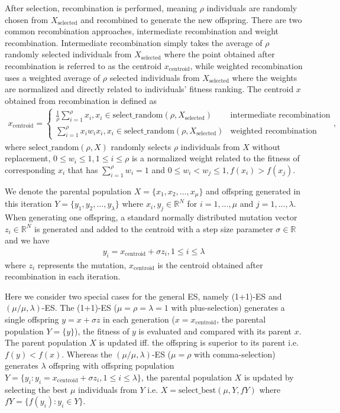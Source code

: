 After selection, recombination is performed, meaning $\rho$ individuals are randomly chosen from $X_{\text{selected}}$ and recombined to generate the new offspring. There are two common recombination approaches, intermediate recombination and weight recombination. Intermediate recombination simply takes the average of $\rho$ randomly selected individuals from $X_{\text{selected}}$ where the point obtained after recombination is referred to as the centroid $x_{\text{centroid}}$, while weighted recombination uses a weighted average of $\rho$ selected individuals from $X_{\text{selected}}$ where the weights are normalized and directly related to individuals' fitness ranking. The centroid $x$ obtained from recombination is defined as
\begin{align}
x_{\text{centroid}} = 
\begin{cases}
\frac{1}{\rho} \sum_{i=1}^\rho x_i,x_i \in \text{select\_random} (\rho , X_{\text{selected}}) & \text{intermediate recombination}\\
\sum_{i=1}^\rho x_i w_i x_i ,x_i \in \text{select\_random} (\rho , X_{\text{selected}}) & \text{weighted recombination}
\end{cases},
\end{align}
where $\text{select\_random}(\rho,X)$ randomly selects $\rho$ individuals from $X$ without replacement, $0 \leq w_i \leq 1, 1 \leq i \leq \rho$ is a normalized weight related to the fitness of corresponding $x_i$ that has $\sum_{i=1}^\rho w_i = 1$ and $0\leq w_i < w_j \leq 1,f(x_i) > f(x_j)$. 

We denote the parental population $X = \{x_1,x_2,...,x_\mu\}$ and offspring generated in this iteration $Y = \{y_1,y_2,...,y_{\lambda} \}$ where $x_i,y_j \in \mathbb{R}^N$ for $i=1,...,\mu$ and $j=1,...,\lambda$. When generating one offspring, a standard normally distributed mutation vector $z_i \in \mathbb{R}^N $ is generated and added to the centroid with a step size parameter $\sigma \in \mathbb{R}$ and we have 
\begin{align}
y_i = x_{\text{centroid}} + \sigma z_i, 1\leq i \leq \lambda
\end{align}
where $z_i$ represents the mutation, $x_{\text{centroid}}$ is the centroid obtained after recombination in each iteration. 

Here we consider two special cases for the general ES, namely (1+1)-ES and $(\mu/\mu,\lambda)$-ES. The (1+1)-ES ($\mu = \rho = \lambda=1 $ with plus-selection) generates a single offspring $y = x + \sigma z$ in each generation ($x=x_{\text{centroid}}$, the parental population $Y = \{y\}$), the fitness of $y$ is evaluated and compared with its parent $x$. The parent population $X$ is updated iff. the offspring is superior to its parent i.e. $f(y)<f(x)$. Whereas the $(\mu/\mu,\lambda)$-ES ($\mu=\rho$ with comma-selection) generates $\lambda$ offspring with offspring population $Y = \{ y_i: y_i = x_{\text{centroid}} + \sigma z_i, 1\leq i \leq \lambda \}$, the parental population $X$ is updated by selecting the best $\mu$ individuals from $Y$ i.e. $X = \text{select\_best}(\mu,Y,fY)$ where $fY = \{f(y_i):y_i \in Y \}$.

